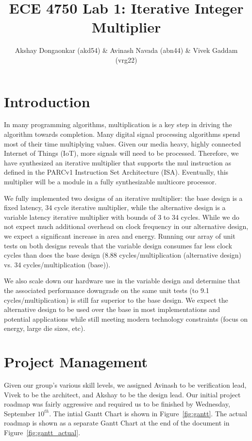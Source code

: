 \documentclass[10pt]{article}
\begin{document}
\title{ECE 4750 Lab 1: Iterative Integer Multiplier}
\author{Akshay Dongaonkar (akd54) \& Avinash Navada (abn44) \& Vivek Gaddam (vrg22)}
\maketitle

\section{Introduction}

In many programming algorithms, multiplication is a key step in driving the algorithm towards completion. 
Many digital signal processing algorithms spend most of their time multiplying values. 
Given our media heavy, highly connected Internet of Things (IoT), more signals will need to be processed.
Therefore, we have synthesized an iterative multiplier that supports the mul instruction as defined in the PARCv1 Instruction Set Architecture (ISA).
Eventually, this multiplier will be a module in a fully synthesizable multicore processor.

We fully implemented two designs of an iterative multiplier: the base design is a fixed latency, 34 cycle iterative multiplier, while the alternative design is a variable latency iterative multiplier with bounds of 3 to 34 cycles.
While we do not expect much additional overhead on clock frequency in our alternative design,
we expect a significant increase in area and energy. Running our array of unit tests on both designs reveals that the variable design consumes far less clock cycles than does the base design (8.88 cycles/multiplication (alternative design) vs. 34 cycles/multiplication (base)).

We also scale down our hardware use in the variable design and determine that the associated performance downgrade on the same unit tests (to 9.1 cycles/multiplication) is still far superior to the base design. We expect the alternative design to be used over the base in most implementations and potential applications while still meeting modern technology constraints (focus on energy, large die sizes, etc).
  


\section{Project Management}

Given our group's various skill levels, we assigned Avinash to be verification lead, Vivek to be the architect, and Akshay to be the design lead.
Our initial project roadmap was fairly aggressive and required us to be finished by Wednesday, September $10^{th}$.
The intial Gantt Chart is shown in Figure~\ref{fig:gantt}.
The actual roadmap is shown as a separate Gantt Chart at the end of the document in Figure~\ref{fig:gantt_actual}.
\end{document}
